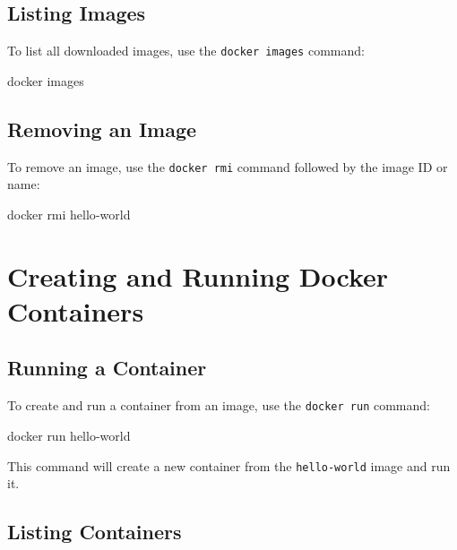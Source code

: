 \documentclass[
  letterpaper,
  DIV=11,
  numbers=noendperiod]{scrreprt}
\newenvironment{Shaded}{\begin{snugshade}}{\end{snugshade}}
\newcommand{\ExtensionTok}[1]{\textcolor[rgb]{0.00,0.23,0.31}{#1}}
\newcommand{\NormalTok}[1]{\textcolor[rgb]{0.00,0.23,0.31}{#1}}
\begin{document}
\subsection{Listing Images}\label{listing-images}

To list all downloaded images, use the \texttt{docker\ images} command:

\begin{Shaded}
\begin{Highlighting}[]
\ExtensionTok{docker}\NormalTok{ images}
\end{Highlighting}
\end{Shaded}

\subsection{Removing an Image}\label{removing-an-image}

To remove an image, use the \texttt{docker\ rmi} command followed by the
image ID or name:

\begin{Shaded}
\begin{Highlighting}[]
\ExtensionTok{docker}\NormalTok{ rmi hello{-}world}
\end{Highlighting}
\end{Shaded}

\section{Creating and Running Docker
Containers}\label{creating-and-running-docker-containers}

\subsection{Running a Container}\label{running-a-container}

To create and run a container from an image, use the
\texttt{docker\ run} command:

\begin{Shaded}
\begin{Highlighting}[]
\ExtensionTok{docker}\NormalTok{ run hello{-}world}
\end{Highlighting}
\end{Shaded}

This command will create a new container from the \texttt{hello-world}
image and run it.

\subsection{Listing Containers}\label{listing-containers}
\end{document}
